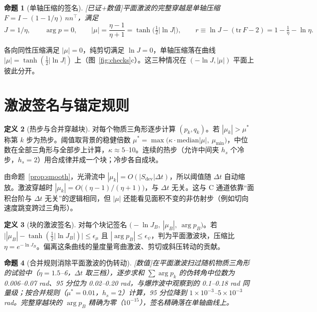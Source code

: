 \documentclass[10.5pt,a4paper]{article}
\theoremstyle{definition}
\newtheorem{definition}{定义}[section]
\theoremstyle{plain}
\newtheorem{proposition}[definition]{命题}
\theoremstyle{remark}
\newcommand{\status}[1]{\hfill{\small\color{accent}\textsf{[#1]}}}
\begin{document}
\begin{proposition}[单轴压缩的签名]\status{已证+数值}\label{prop:uni}
平面激波的完整穿越是单轴压缩 $F=I-(1-1/\eta)\,nn^\top$，满足
\begin{equation}
J=1/\eta,\qquad \arg p=0,\qquad |\mu|=\frac{\eta-1}{\eta+1}=\tanh\!\big(\tfrac12|\ln J|\big),\qquad r\equiv\ln J-(\mathrm{tr}\,F-2)=1-\tfrac1\eta-\ln\eta .
\end{equation}
\end{proposition}

各向同性压缩满足 $|\mu|=0$，纯剪切满足 $\ln J=0$，单轴压缩落在曲线 $|\mu|=\tanh(\frac12|\ln J|)$ 上（图~\ref{fig:checks}c）。这三种情况在 $(-\ln J,|\mu|)$ 平面上彼此分开。
\section{激波签名与锚定规则}\label{sec:anchor}

\begin{definition}[热步与合并穿越块]
对每个物质三角形逐步计算 $(p_k,q_k)$。若 $|\mu_k|>\mu^*$ 称第 $k$ 步为热步。阈值取背景的稳健倍数 $\mu^*=\max\big(\kappa\cdot\mathrm{median}|\mu|,\ \mu_{\min}\big)$，中位数在全部三角形与全部步上计算，$\kappa\approx5$–10。连续的热步（允许中间夹 $h_s$ 个冷步，$h_s=2$）用合成律并成一个块；冷步各自成块。
\end{definition}

由命题~\ref{prop:smooth}，光滑流中 $|\mu_k|=O(|S_{\mathrm{dev}}|\Delta t)$，所以阈值随 $\Delta t$ 自动缩放。激波穿越时 $|\mu_k|=O\big((\eta-1)/(\eta+1)\big)$，与 $\Delta t$ 无关。这与 C 通道依靠“面积台阶与 $\Delta t$ 无关”的逻辑相同，但 $|\mu|$ 还能看见面积不变的非仿射步（例如切向速度跳变跨过三角形）。

\begin{definition}[块的激波签名]
对每个块记签名 $\big(-\ln J_B,\ |\mu_B|,\ \arg p_B\big)$。若 $\big||\mu_B|-\tanh(\tfrac12|\ln J_B|)\big|\le\epsilon_\mu$ 且 $|\arg p_B|\le\epsilon_\psi$，判为平面激波块，压缩比 $\eta=e^{-\ln J_B}$。偏离这条曲线的量度量弯曲激波、剪切或斜压转动的贡献。
\end{definition}

\begin{proposition}[合并规则消除平面激波的伪转动]\status{数值}\label{prop:merge}
在平面激波扫过随机物质三角形的试验中（$\eta=1.5$–6，$\Delta t$ 取三档），逐步求和 $\sum\arg p_k$ 的伪转角中位数为 0.006–0.07 rad、95 分位为 0.02–0.20 rad，与爆炸波中观察到的 0.1–0.18 rad 同量级；按合并规则（$\mu^*=0.01$，$h_s=2$）计算，95 分位降到 $1\times10^{-3}$–$5\times10^{-3}$ rad。完整穿越块的 $\arg p_B$ 精确为零（$10^{-15}$），签名精确落在单轴曲线上。
\end{proposition}
\end{document}
